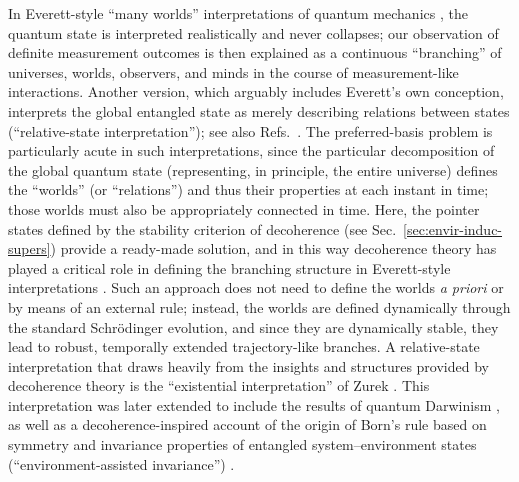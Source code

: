 \documentclass[3p,sort&compress,12pt]{elsarticle}
\begin{document}
In Everett-style ``many worlds'' interpretations of quantum mechanics \cite{Everett:1957:rw,Wallace:2010:im}, the quantum state is interpreted realistically and never collapses; our observation of definite measurement outcomes is then explained as a continuous ``branching'' of universes, worlds, observers, and minds in the course of measurement-like interactions. Another version, which arguably includes Everett's own conception, interprets the global entangled state as merely describing relations between states (``relative-state interpretation''); see also Refs.~\cite{Rovelli:1996:rq,Mermin:1998:ii}. The preferred-basis problem is particularly acute in such interpretations, since the particular decomposition of the global quantum state (representing, in principle, the entire universe) defines the ``worlds'' (or ``relations'') and thus their properties at each instant in time; those worlds must also be appropriately connected in time. Here, the pointer states defined by the stability criterion of decoherence (see Sec.~\ref{sec:envir-induc-supers}) provide a ready-made solution, and in this way decoherence theory has played a critical role in defining the branching structure in Everett-style interpretations \cite{Zurek:1998:re,Butterfield:2001:ua,Wallace:2003:iq,Wallace:2003:iz,Wallace:2010:im}. Such an approach does not need to define the worlds \emph{a priori} or by means of an external rule; instead, the worlds are defined dynamically through the standard Schr\"odinger evolution, and since they are dynamically stable, they lead to robust, temporally extended trajectory-like branches. A relative-state interpretation that draws heavily from the insights and structures provided by decoherence theory is the ``existential interpretation'' of Zurek \cite{Zurek:1993:pu,Zurek:1998:re,Zurek:2004:yb}. This interpretation was later extended to include the results of quantum Darwinism \cite{Zurek:2009:om}, as well as a decoherence-inspired account of the origin of Born's rule based on symmetry and invariance properties of entangled system--environment states (``environment-assisted invariance'') \cite{Zurek:2002:ii,Zurek:2003:rv,Zurek:2003:pl,Zurek:2004:yb,Zurek:2009:om,Zurek:2018:on,Schlosshauer:2003:ms,Barnum:2003:yb,Mohrhoff:2004:tv}.
\end{document}
